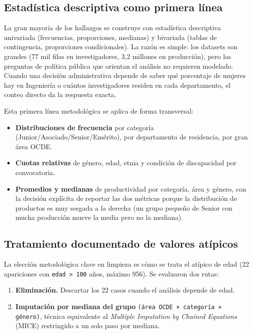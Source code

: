 \documentclass[11pt,a4paper,oneside]{article}
\begin{document}
\subsection{Estadística descriptiva como primera línea}

La gran mayoría de los hallazgos se construye con estadística descriptiva univariada (frecuencias, proporciones, medianas) y bivariada (tablas de contingencia, proporciones condicionales). La razón es simple: los datasets son grandes (77 mil filas en investigadores, 3{,}2 millones en producción), pero las preguntas de política pública que orientan el análisis no requieren modelado. Cuando una decisión administrativa depende de saber qué porcentaje de mujeres hay en Ingeniería o cuántos investigadores residen en cada departamento, el conteo directo da la respuesta exacta.

Esta primera línea metodológica se aplica de forma transversal:
\begin{itemize}
\item \textbf{Distribuciones de frecuencia} por categoría (Junior/Asociado/Senior/Emérito), por departamento de residencia, por gran área OCDE.
\item \textbf{Cuotas relativas} de género, edad, etnia y condición de discapacidad por convocatoria.
\item \textbf{Promedios y medianas} de productividad por categoría, área y género, con la decisión explícita de reportar las dos métricas porque la distribución de productos es muy sesgada a la derecha (un grupo pequeño de Senior con mucha producción mueve la media pero no la mediana).
\end{itemize}

\subsection{Tratamiento documentado de valores atípicos}

La elección metodológica clave en limpieza es cómo se trata el atípico de edad (22 apariciones con \texttt{edad > 100} años, máximo 956). Se evaluaron dos rutas:

\begin{enumerate}
\item \textbf{Eliminación.} Descartar los 22 casos cuando el análisis depende de edad.
\item \textbf{Imputación por mediana del grupo} \texttt{(área OCDE × categoría × género)}, técnica equivalente al \emph{Multiple Imputation by Chained Equations} (MICE) restringido a un solo paso por mediana.
\end{enumerate}
\end{document}
